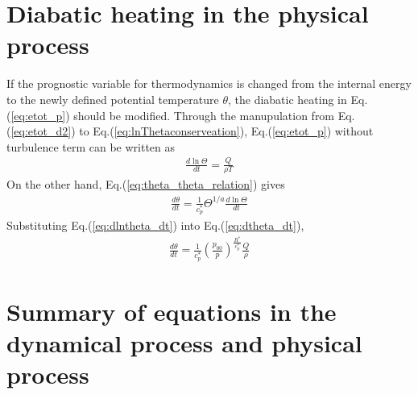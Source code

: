 \section{Diabatic heating in the physical process}

If the prognostic variable for thermodynamics is changed
from the internal energy to the newly defined potential temperature $\theta$,
the diabatic heating in Eq.(\ref{eq:etot_p}) should be modified.
Through
the manupulation from Eq.(\ref{eq:etot_d2}) to Eq.(\ref{eq:lnThetaconserveation}),
Eq.(\ref{eq:etot_p}) without turbulence term can be written as
\begin{eqnarray}
  \frac{d \ln \Theta}{dt} = \frac{Q}{\rho T}
  \label{eq:dlntheta_dt}
\end{eqnarray}
On the other hand, Eq.(\ref{eq:theta_theta_relation}) gives
\begin{eqnarray}
  \frac{d \theta}{dt} = \frac{1}{c_p^*} \Theta^{1/a} \frac{d \ln \Theta}{dt}
  \label{eq:dtheta_dt}
\end{eqnarray}
Substituting Eq.(\ref{eq:dlntheta_dt}) into Eq.(\ref{eq:dtheta_dt}),
\begin{eqnarray}
  \frac{d \theta}{dt} = \frac{1}{c_p^*}
  \left(\frac{p_{00}}{p}\right)^{\frac{R^*}{c_p^*}} \frac{Q}{\rho}
\end{eqnarray}

\section{Summary of equations in the dynamical process and physical process}
